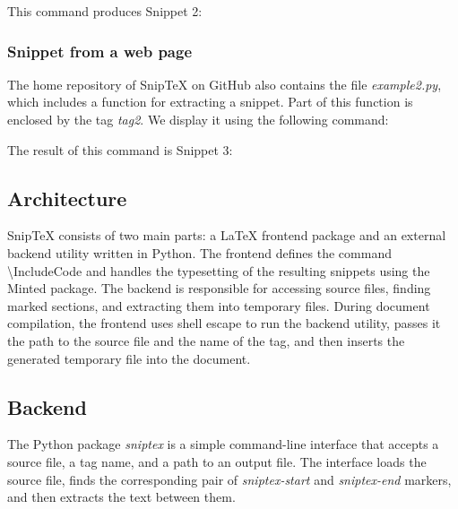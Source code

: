 \documentclass{article}
\begin{document}
This command produces Snippet 2:


\newpage

\subsubsection*{Snippet from a web page}

The home repository of Snip\TeX{} on GitHub also contains the file \textit{example2.py}, 
which includes a function for extracting a snippet. 
Part of this function is enclosed by the tag \textit{tag2}. 
We display it using the following command:


The result of this command is Snippet 3:


\subsection*{Architecture}

Snip\TeX{} consists of two main parts: a La\TeX{} frontend package and an external backend utility written in Python. 
The frontend defines the command \textbackslash{}IncludeCode and handles the typesetting of the resulting snippets 
using the Minted package. The backend is responsible for accessing source files, finding marked sections, 
and extracting them into temporary files. During document compilation, the frontend uses shell escape 
to run the backend utility, passes it the path to the source file and the name of the tag, 
and then inserts the generated temporary file into the document.

\subsection*{Backend}

The Python package \textit{sniptex} is a simple command-line interface that accepts a source file, 
a tag name, and a path to an output file. The interface loads the source file, 
finds the corresponding pair of \textit{sniptex-start} and \textit{sniptex-end} markers, 
and then extracts the text between them.
\end{document}
